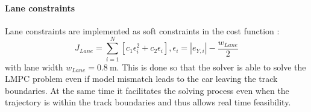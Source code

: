 \paragraph{Lane constraints} Lane constraints are implemented as soft constraints in the cost function \cite[p.~114]{Borrelli2003}:
\begin{equation}\label{eq:softLaneConstraints}
J_{Lane} = \sum_{i=1}^N [c_1\epsilon_i^2 + c_2\epsilon_i], \epsilon_i = |e_{Y,i}|-\frac{w_{Lane}}{2}
\end{equation}
with lane width $w_{Lane}=\SI{0.8}{\meter}$. This is done so that the solver is able to solve the LMPC problem even if model mismatch leads to the car leaving the track boundaries. At the same time it facilitates the solving process even when the trajectory is within the track boundaries and thus allows real time feasibility. %
